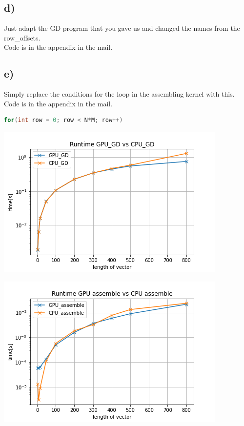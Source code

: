 \documentclass[11pt,a4paper]{article}
\begin{document}
\subsection*{d)}
Just adapt the GD program that you gave us and changed the names from the row\_offsets.\\
Code is in the appendix in the mail.
\subsection*{e)}
Simply replace the conditions for the loop in the assembling kernel with this.\\
Code is in the appendix in the mail.
\begin{lstlisting}[language=C++, caption={kernel for serching for zeros)}]
for(int row = 0; row < N*M; row++)
\end{lstlisting}

\begin{minipage}[t]{0.49\textwidth}
	\includegraphics[width=\textwidth]{Bilder/runtime_GPU_vs_CPU}
\end{minipage}
\begin{minipage}[t]{0.49\textwidth}
	\includegraphics[width=\textwidth]{Bilder/runtime_assemble_GPU_vs_assemble_CPU}
\end{minipage}
\end{document}
